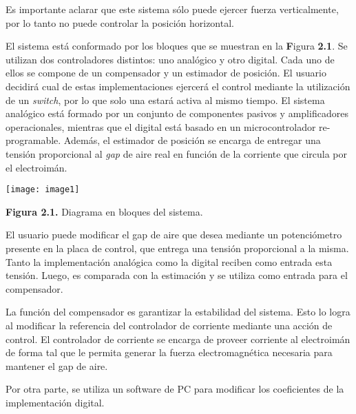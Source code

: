 \documentclass{article} %
\begin{document}
\noindent 

\noindent Es importante aclarar que este sistema s\'{o}lo puede ejercer fuerza verticalmente, por lo tanto no puede controlar la posici\'{o}n horizontal.

\noindent 

\noindent El sistema est\'{a} conformado por los bloques que se muestran en la \textbf{F}igura \textbf{2.1}. Se utilizan dos controladores distintos: uno anal\'{o}gico y otro digital. Cada uno de ellos se compone de un compensador y un estimador de posici\'{o}n.  El usuario decidir\'{a} cual de estas implementaciones ejercer\'{a} el control mediante la utilizaci\'{o}n de un \textit{switch}, por lo que solo una estar\'{a} activa al mismo tiempo. El sistema anal\'{o}gico est\'{a} formado por un conjunto de componentes pasivos y amplificadores operacionales, mientras que el digital est\'{a} basado en un microcontrolador re-programable. Adem\'{a}s, el estimador de posici\'{o}n se encarga de  entregar una tensi\'{o}n proporcional al \textit{gap }de aire real en funci\'{o}n de  la corriente que circula por el electroim\'{a}n.

\noindent 

\noindent \texttt{[image: image1]}

\noindent \textbf{Figura 2.1. }Diagrama en bloques del sistema.

\noindent 

\noindent El usuario puede modificar el gap de aire que desea mediante un potenci\'{o}metro presente en la placa de control, que entrega una tensi\'{o}n proporcional a la misma. Tanto la implementaci\'{o}n anal\'{o}gica como la digital reciben como entrada esta tensi\'{o}n. Luego, es comparada con la estimaci\'{o}n y se utiliza como entrada para el compensador.

\noindent 

\noindent La funci\'{o}n del compensador es garantizar la estabilidad del sistema. Esto lo logra al modificar la referencia del controlador de corriente mediante una acci\'{o}n de control. El controlador de corriente se encarga de proveer corriente al electroim\'{a}n de forma tal que le permita generar la fuerza electromagn\'{e}tica necesaria para mantener el gap de aire. 

\noindent 

\noindent Por otra parte, se utiliza un software de PC para modificar los coeficientes de la implementaci\'{o}n digital.

\noindent \eject 
\end{document}
